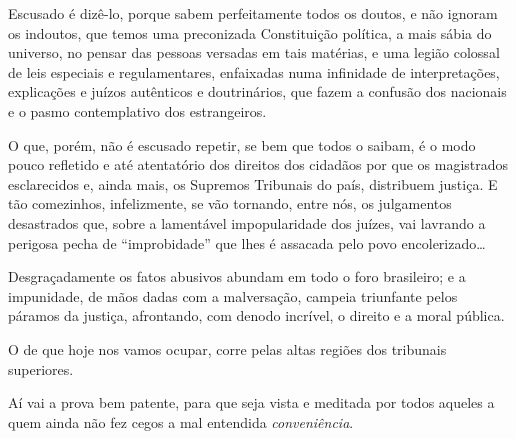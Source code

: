 Escusado é dizê-lo, porque sabem perfeitamente todos os doutos, e não
ignoram os indoutos, que temos uma preconizada Constituição política, a
mais sábia do universo, no pensar das pessoas versadas em tais matérias,
e uma legião colossal de leis especiais e regulamentares, enfaixadas
numa infinidade de interpretações, explicações e juízos autênticos e
doutrinários, que fazem a confusão dos nacionais e o pasmo contemplativo
dos estrangeiros.

O que, porém, não é escusado repetir, se bem que todos o saibam, é o
modo pouco refletido e até atentatório dos direitos dos cidadãos por que
os magistrados esclarecidos e, ainda mais, os Supremos Tribunais do
país, distribuem justiça. E tão comezinhos, infelizmente, se vão
tornando, entre nós, os julgamentos desastrados que, sobre a lamentável
impopularidade dos juízes, vai lavrando a perigosa pecha de
``improbidade'' que lhes é assacada pelo povo encolerizado\ldots{}

Desgraçadamente os fatos abusivos abundam em todo o foro brasileiro; e a
impunidade, de mãos dadas com a malversação, campeia triunfante pelos
páramos da justiça, afrontando, com denodo incrível, o direito e a moral
pública.

O de que hoje nos vamos ocupar, corre pelas altas regiões dos tribunais
superiores.

Aí vai a prova bem patente, para que seja vista e meditada por todos
aqueles a quem ainda não fez cegos a mal entendida \emph{conveniência}.

